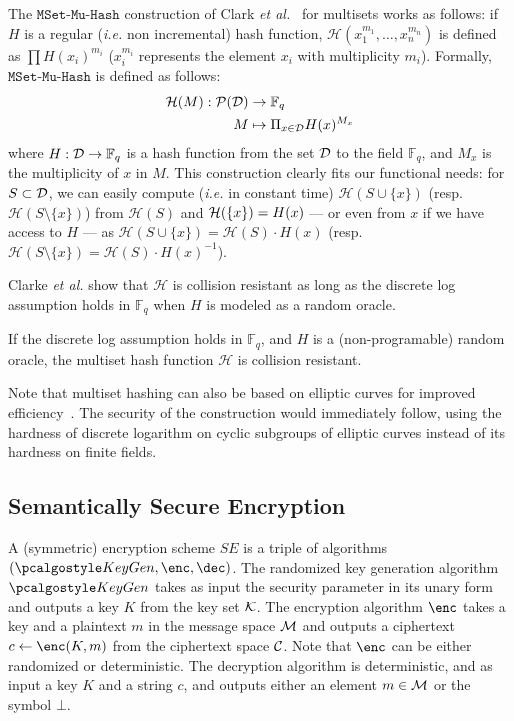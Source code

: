 The $\mathtt{MSet\texttt{-}Mu\texttt{-}Hash}$ construction of Clark \emph{et al.}~\cite{AC:CDDGS03} for multisets works as follows: if $H$ is a regular (\emph{i.e.} non incremental) hash function, $\mathcal{H}({x_1^{m_1},\dots,x_n^{m_n}})$ is defined as $\prod H(x_i)^{m_i}$ ($x_i^{m_i}$ represents the element $x_i$ with multiplicity $m_i$).
Formally, $\mathtt{MSet\texttt{-}Mu\texttt{-}Hash}$ is defined as follows:
\begin{align*}
	\mathcal{H}(M) 
	: \mathcal{P}(\mathcal{D}) &\rightarrow \mathbb{F}_q \\
	  M &\mapsto \Pi_{x \in \mathcal{D}} H(x)^{M_x}
\end{align*}
where $H : \mathcal{D} \rightarrow \mathbb{F}_q$ is a hash function from the set $\mathcal{D}$ to the field $\mathbb{F}_q$, and $M_x$ is the multiplicity of $x$ in $M$.
This construction clearly fits our functional needs: for $S \subset \mathcal{D}$, we can easily compute (\emph{i.e.} in constant time) $\mathcal{H}(S \cup \{x\})$ (resp. $\mathcal{H}(S \setminus \{x\})$) from $\mathcal{H}(S)$ and $\mathcal{H}(\{x\}) = H(x)$ --- or even from $x$ if we have access to $H$ --- 
as $\mathcal{H}(S \cup \{x\}) = \mathcal{H}(S) \cdot H(x)$ (resp. $\mathcal{H}(S \setminus \{x\}) = \mathcal{H}(S) \cdot H(x)^{-1}$).

Clarke \emph{et al.} show that $\mathcal{H}$ is collision resistant as long as the discrete log assumption holds in $\mathbb{F}_q$ when $H$ is modeled as a random oracle.
\begin{theorem}
	If the discrete log assumption holds in $\mathbb{F}_q$, and $H$ is a (non-programable) random oracle, the multiset hash function $\mathcal{H}$ is collision resistant.
\end{theorem}
Note that multiset hashing can also be based on elliptic curves for improved efficiency~\cite{CJ:MaiTibAra16}.
The security of the construction would immediately follow, using the hardness of discrete logarithm on cyclic subgroups of elliptic curves 
instead of its hardness on finite fields.



\subsection{Semantically Secure Encryption} %
\label{sub:def_encryption}

A (symmetric) encryption scheme $SE$ is a triple of algorithms $(\KeyGen, \Enc, \Dec)$.
The randomized key generation algorithm $\KeyGen$ takes as input the security parameter in its unary form and outputs a key $K$ from the key set $\mathcal{K}$.
The encryption algorithm $\Enc$ takes a key and a plaintext $m$ in the message space $\mathcal{M}$ and outputs a ciphertext $c \gets \Enc(K,m)$ from the ciphertext space $\mathcal{C}$. Note that $\Enc$ can be either randomized or deterministic.
The decryption algorithm is deterministic, and as input a key $K$ and a string $c$, and outputs either an element $m \in \mathcal{M}$ or the symbol $\bot$.

